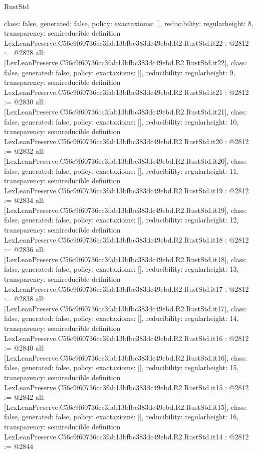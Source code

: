 \begin{lexlean}{RustStd}
\begin{coremodule}
{  class: false,
  generated: false,
  policy: exact{axioms: []},
  reducibility: regular{height: 8},
  transparency: semireducible
}
definition LexLeanPreserve.C56c9f60736cc3fab13bfbc383dc49ebd.R2.RustStd.it22 : @2812 := @2828 {
  all: [LexLeanPreserve.C56c9f60736cc3fab13bfbc383dc49ebd.R2.RustStd.it22],
  class: false,
  generated: false,
  policy: exact{axioms: []},
  reducibility: regular{height: 9},
  transparency: semireducible
}
definition LexLeanPreserve.C56c9f60736cc3fab13bfbc383dc49ebd.R2.RustStd.it21 : @2812 := @2830 {
  all: [LexLeanPreserve.C56c9f60736cc3fab13bfbc383dc49ebd.R2.RustStd.it21],
  class: false,
  generated: false,
  policy: exact{axioms: []},
  reducibility: regular{height: 10},
  transparency: semireducible
}
definition LexLeanPreserve.C56c9f60736cc3fab13bfbc383dc49ebd.R2.RustStd.it20 : @2812 := @2832 {
  all: [LexLeanPreserve.C56c9f60736cc3fab13bfbc383dc49ebd.R2.RustStd.it20],
  class: false,
  generated: false,
  policy: exact{axioms: []},
  reducibility: regular{height: 11},
  transparency: semireducible
}
definition LexLeanPreserve.C56c9f60736cc3fab13bfbc383dc49ebd.R2.RustStd.it19 : @2812 := @2834 {
  all: [LexLeanPreserve.C56c9f60736cc3fab13bfbc383dc49ebd.R2.RustStd.it19],
  class: false,
  generated: false,
  policy: exact{axioms: []},
  reducibility: regular{height: 12},
  transparency: semireducible
}
definition LexLeanPreserve.C56c9f60736cc3fab13bfbc383dc49ebd.R2.RustStd.it18 : @2812 := @2836 {
  all: [LexLeanPreserve.C56c9f60736cc3fab13bfbc383dc49ebd.R2.RustStd.it18],
  class: false,
  generated: false,
  policy: exact{axioms: []},
  reducibility: regular{height: 13},
  transparency: semireducible
}
definition LexLeanPreserve.C56c9f60736cc3fab13bfbc383dc49ebd.R2.RustStd.it17 : @2812 := @2838 {
  all: [LexLeanPreserve.C56c9f60736cc3fab13bfbc383dc49ebd.R2.RustStd.it17],
  class: false,
  generated: false,
  policy: exact{axioms: []},
  reducibility: regular{height: 14},
  transparency: semireducible
}
definition LexLeanPreserve.C56c9f60736cc3fab13bfbc383dc49ebd.R2.RustStd.it16 : @2812 := @2840 {
  all: [LexLeanPreserve.C56c9f60736cc3fab13bfbc383dc49ebd.R2.RustStd.it16],
  class: false,
  generated: false,
  policy: exact{axioms: []},
  reducibility: regular{height: 15},
  transparency: semireducible
}
definition LexLeanPreserve.C56c9f60736cc3fab13bfbc383dc49ebd.R2.RustStd.it15 : @2812 := @2842 {
  all: [LexLeanPreserve.C56c9f60736cc3fab13bfbc383dc49ebd.R2.RustStd.it15],
  class: false,
  generated: false,
  policy: exact{axioms: []},
  reducibility: regular{height: 16},
  transparency: semireducible
}
definition LexLeanPreserve.C56c9f60736cc3fab13bfbc383dc49ebd.R2.RustStd.it14 : @2812 := @2844 {
}
\end{coremodule}
\end{lexlean}
